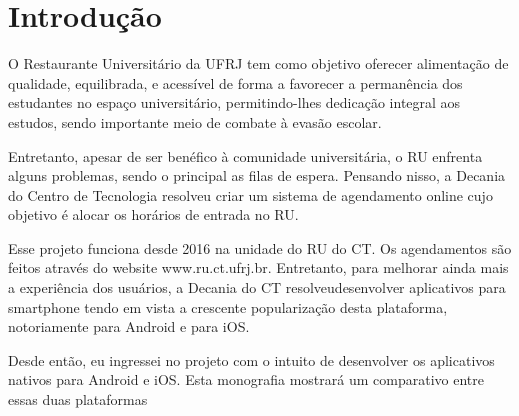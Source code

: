 \chapter{Introdução}

O Restaurante Universitário da UFRJ tem como objetivo oferecer alimentação de qualidade, equilibrada, e 
acessível de forma a favorecer a permanência dos estudantes no espaço universitário, permitindo-lhes 
dedicação integral aos estudos, sendo importante meio de combate à evasão escolar.

Entretanto, apesar de ser benéfico à comunidade universitária, o RU enfrenta alguns problemas, sendo o 
principal as filas de espera. Pensando nisso, a Decania do Centro de Tecnologia resolveu criar um sistema
 de agendamento online cujo objetivo é alocar os horários de entrada no RU.

Esse projeto funciona desde 2016 na unidade do RU do CT. Os agendamentos são feitos através do website
www.ru.ct.ufrj.br. Entretanto, para melhorar ainda mais a experiência dos usuários, a Decania do CT 
resolveudesenvolver aplicativos para smartphone tendo em vista a crescente popularização desta 
plataforma, notoriamente para Android e para iOS.

Desde então, eu ingressei no projeto com o intuito de desenvolver os aplicativos nativos para Android e 
iOS. Esta monografia mostrará um comparativo entre essas duas plataformas